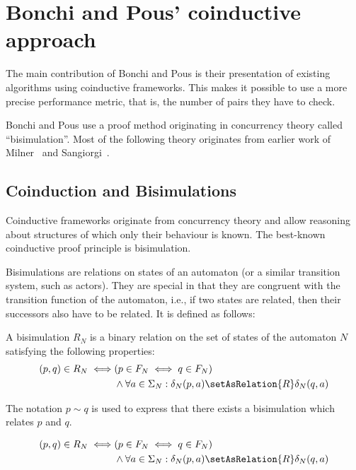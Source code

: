 \section{Bonchi and Pous' coinductive approach}

The main contribution of Bonchi and Pous is their presentation of existing
algorithms using coinductive frameworks. This makes it possible to use a more
precise performance metric, that is, the number of pairs they have to check.

Bonchi and Pous use a proof method originating in concurrency theory called
``bisimulation''. Most of the following theory originates from earlier work of
Milner~\cite{milner1989communication} and Sangiorgi~\cite{sangiorgi1998bisimulation}.

\subsection{Coinduction and Bisimulations}

Coinductive frameworks originate from concurrency theory and allow reasoning
about structures of which only their behaviour is known. The best-known
coinductive proof principle is bisimulation.

Bisimulations are relations on states of an automaton (or a similar transition
system, such as actors). They are special in that they are
congruent with the transition function of the automaton, i.e., if two states are
related, then their successors also have to be related.
It is defined as follows:

\begin{definition}
  A bisimulation $R_N$ is a binary relation on the set of states of
  the automaton $N$ satisfying the following properties:
  \begin{align*}
    (p, q) \in R_N \iff &(p \in F_N \iff q \in F_N)\\
      &\land \forall a \in \Sigma_N: \delta_N(p, a) \setAsRelation{R} \delta_N(q, a)
  \end{align*}

  The notation $p \sim q$ is used to express that there exists a bisimulation
  which relates {$p$ and $q$}.
\end{definition}

\begin{definition}
  \begin{align*}
    (p, q) \in R_N \iff &(p \in F_N \iff q \in F_N)\\
      &\land \forall a \in \Sigma_N: \delta_N(p, a) \setAsRelation{R} \delta_N(q, a)
  \end{align*}
\end{definition}

